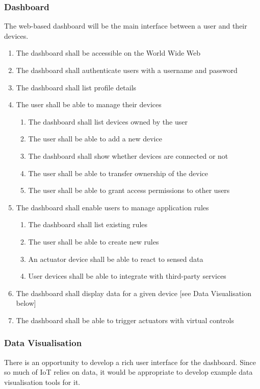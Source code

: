       \subsubsection{Dashboard}
        The web-based dashboard will be the main interface between a user and their devices.

        \begin{enumerate}
          \item The dashboard shall be accessible on the World Wide Web
          \item The dashboard shall authenticate users with a username and password
          \item The dashboard shall list profile details
          \item The user shall be able to manage their devices
          \begin{enumerate}
            \item The dashboard shall list devices owned by the user
            \item The user shall be able to add a new device
            \item The dashboard shall show whether devices are connected or not
            \item The user shall be able to transfer ownership of the device
            \item The user shall be able to grant access permissions to other users
          \end{enumerate}
          \item The dashboard shall enable users to manage application rules
          \begin{enumerate}
            \item The dashboard shall list existing rules
            \item The user shall be able to create new rules
            \item An actuator device shall be able to react to sensed data
            \item User devices shall be able to integrate with third-party services
          \end{enumerate}
          \item The dashboard shall display data for a given device [see Data Visualisation below]
          \item The dashboard shall be able to trigger actuators with virtual controls
        \end{enumerate}

      \subsubsection{Data Visualisation}
        There is an opportunity to develop a rich user interface for the dashboard. Since so much of IoT relies on data, it would be appropriate to develop example data visualisation tools for it.

